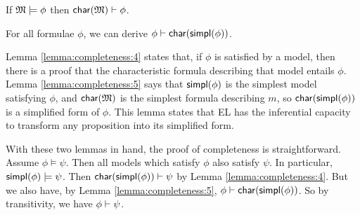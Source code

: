 





\begin{lemma}\label{lemma:completeness:4}
If $\frak{M} \models \phi$ then $\mathsf{char}(\frak{M}) \vdash \phi$.
\end{lemma}

\begin{lemma}\label{lemma:completeness:5}
For all formulae $\phi$, we can derive $\phi \vdash \mathsf{char}(\mathsf{simpl}(\phi))$.
\end{lemma}

\NI Lemma \ref{lemma:completeness:4} states that, if $\phi$ is
satisfied by a model, then there is a proof that the characteristic
formula describing that model entails $\phi$.  Lemma
\ref{lemma:completeness:5} says that $\mathsf{simpl}(\phi)$ is the simplest
model satisfying $\phi$, and $\mathsf{char}(\frak{M})$ is the simplest formula
describing $m$, so $\mathsf{char}(\mathsf{simpl}(\phi))$ is a simplified form of
$\phi$. This lemma states that EL has the inferential capacity to
transform any proposition into its simplified form.

With these two lemmas in hand, the proof of completeness is
straightforward.  Assume $\phi \models \psi$.  Then all models which satisfy
$\phi$ also satisfy $\psi$.  In particular, $\mathsf{simpl}(\phi) \models \psi$.  Then
$\mathsf{char}(\mathsf{simpl}(\phi)) \vdash \psi$ by Lemma \ref{lemma:completeness:4}.  But we
also have, by Lemma \ref{lemma:completeness:5}, $\phi \vdash
\mathsf{char}(\mathsf{simpl}(\phi)) $.  So by transitivity, we have $\phi \vdash \psi$.  




